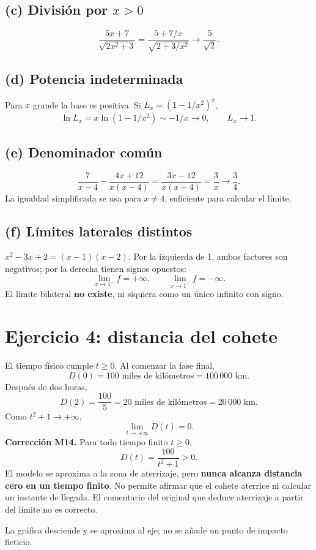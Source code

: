 \documentclass[11pt]{article}
\begin{document}
\subsection*{(c) División por $x>0$}
\[\frac{5x+7}{\sqrt{2x^2+3}}=\frac{5+7/x}{\sqrt{2+3/x^2}}\longrightarrow\boxed{\frac5{\sqrt2}}.\]
\subsection*{(d) Potencia indeterminada}
Para $x$ grande la base es positiva. Si $L_x=(1-1/x^2)^x$,
\[\ln L_x=x\ln(1-1/x^2)\sim-1/x\longrightarrow0,\qquad\boxed{L_x\longrightarrow1}.\]
\subsection*{(e) Denominador común}
\[\frac7{x-4}-\frac{4x+12}{x(x-4)}=\frac{3x-12}{x(x-4)}=\frac3x\longrightarrow\boxed{\frac34}.\]
La igualdad simplificada se usa para $x\neq4$, suficiente para calcular el límite.
\subsection*{(f) Límites laterales distintos}
$x^2-3x+2=(x-1)(x-2)$. Por la izquierda de 1, ambos factores son negativos; por la derecha tienen signos opuestos:
\[\lim_{x\to1^-}f=+\infty,\qquad\lim_{x\to1^+}f=-\infty.\]
El límite bilateral \textbf{no existe}, ni siquiera como un único infinito con signo.
\clearpage
\section*{Ejercicio 4: distancia del cohete}
El tiempo físico cumple $t\geq0$. Al comenzar la fase final,
\[D(0)=100\text{ miles de kilómetros}=\boxed{100\,000\text{ km}}.\]
Después de dos horas,
\[D(2)=\frac{100}{5}=20\text{ miles de kilómetros}=\boxed{20\,000\text{ km}}.\]
Como $t^2+1\to+\infty$,
\[\boxed{\lim_{t\to+\infty}D(t)=0}.\]
\textbf{Corrección M14.} Para todo tiempo finito $t\geq0$,
\[D(t)=\frac{100}{t^2+1}>0.\]
El modelo se aproxima a la zona de aterrizaje, pero \textbf{nunca alcanza distancia cero en un tiempo finito}. No permite afirmar que el cohete aterrice ni calcular un instante de llegada. El comentario del original que deduce aterrizaje a partir del límite no es correcto.
\begin{center}\end{center}
La gráfica desciende y se aproxima al eje; no se añade un punto de impacto ficticio.
\clearpage
\end{document}
